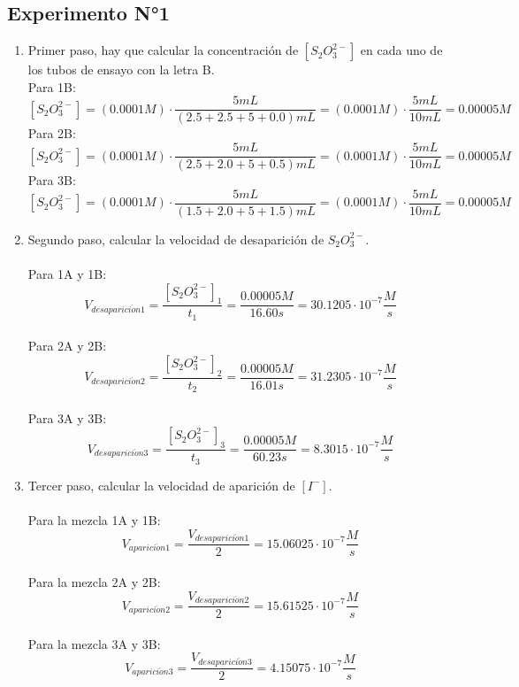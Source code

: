 \documentclass[../main.tex]{subfiles}
\begin{document}
\subsection{Experimento N°1}
\begin{enumerate}
    \item Primer paso, hay que calcular la concentración de $[S_2O_3^{2-}]$ en cada uno de los tubos de ensayo con la letra B.\\
Para 1B: 
\[[S_2O_3^{2-}]=(0.0001M) \cdot \frac{5mL}{(2.5+2.5+5+0.0)mL} =(0.0001M) \cdot \frac{5mL}{10mL}=0.00005 M\]
Para 2B:
\[[S_2O_3^{2-}]=(0.0001M) \cdot \frac{5mL}{(2.5+2.0+5+0.5)mL} =(0.0001M) \cdot \frac{5mL}{10mL}=0.00005 M\]
Para 3B: 
\[[S_2O_3^{2-}]=(0.0001M) \cdot \frac{5mL}{(1.5+2.0+5+1.5)mL} =(0.0001M) \cdot \frac{5mL}{10mL}=0.00005 M\]

\item Segundo paso, calcular la velocidad de desaparición de $S_2O_3^{2-}$.\\
\\ Para  1A y 1B: 
\[V_{desaparici\acute{o}n1}=\frac{[S_2O_3^{2-}]_1}{t_1}=\frac{0.00005M}{16.60s}=30.1205 \cdot 10^{-7} \frac{M}{s}\]
\\ Para 2A y 2B:  
\[V_{desaparici\acute{o}n2}=\frac{[S_2O_3^{2-}]_2}{t_2}=\frac{0.00005M}{16.01s}=31.2305 \cdot 10^{-7} \frac{M}{s}\]
\\ Para 3A y 3B:  
\[V_{desaparici\acute{o}n3}=\frac{[S_2O_3^{2-}]_3}{t_3}=\frac{0.00005M}{60.23s}=8.3015 \cdot 10^{-7} \frac{M}{s}\]

\item Tercer paso, calcular la velocidad de aparición de $[I^{-}]$.\\
\\Para la mezcla 1A y 1B: 
\[V_{aparici\acute{o}n1}=\frac{V_{desaparici\acute{o}n1}}{2}=15.06025 \cdot 10^{-7} \frac{M}{s}\]
\\Para la mezcla 2A y 2B: 
\[V_{aparici\acute{o}n2}=\frac{V_{desaparici\acute{o}n2}}{2}=15.61525 \cdot 10^{-7} \frac{M}{s}\]
\\Para la mezcla 3A y 3B: 
\[V_{aparici\acute{o}n3}=\frac{V_{desaparici\acute{o}n3}}{2}=4.15075 \cdot 10^{-7} \frac{M}{s}\]


\end{enumerate}
\end{document}
